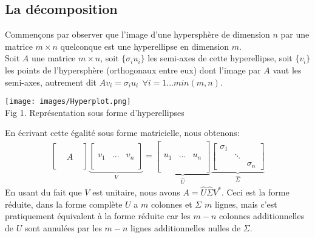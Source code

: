 \documentclass[11pt]{article}
\begin{document}
\subsection*{La décomposition}
Commençons par observer que l'image d'une hypersphère de dimension $n$ par une matrice $m \times n$ quelconque est une hyperellipse en dimension $m$.\\
Soit $A$ une matrice $m \times n$, soit $\{\sigma_iu_i\}$ les semi-axes de cette hyperellipse, soit $\{v_i\}$ les points de l'hypersphère (orthogonaux entre eux) dont l'image par $A$ vaut les semi-axes, autrement dit $Av_i = \sigma_iu_i ~~ \forall i = 1...min(m, n)$.\\
\begin{center}
    \texttt{[image: images/Hyperplot.png]}\\
    \caption{Fig 1. Représentation sous forme d'hyperellipses}
\end{center}
En écrivant cette égalité sous forme matricielle, nous obtenons:
\begin{align*}
	\left[
		\begin{array}{ccc}
			&&\\&&\\&A&\\&&\\&&
		\end{array}
	\right]
	\underbrace{
	\left[
		\begin{array}{c|c|c}
			&&\\&&\\v_1&...&v_n\\&&\\&&
		\end{array}
	\right]}_{V}
	=
	\underbrace{
	\left[
		\begin{array}{c|c|c}
			&&\\&&\\&&\\u_1&...&u_n\\&&\\&&\\&&
		\end{array}
	\right]}_{\hat{U}}
	\underbrace{
	\left[
		\begin{array}{ccc}
			\sigma_1&&\\&\ddots&\\&&\sigma_n
		\end{array}
	\right]}_{\hat{\Sigma}}
\end{align*}
En usant du fait que $V$ est unitaire, nous avons $A = \hat{U}\hat{\Sigma}V^*$. Ceci est la forme réduite, dans la forme complète $U$ a $m$ colonnes et $\Sigma$ $m$ lignes, mais c'est pratiquement équivalent à la forme réduite car les $m-n$ colonnes additionnelles de $U$ sont annulées par les $m-n$ lignes additionnelles nulles de $\Sigma$.\\\\
\end{document}
